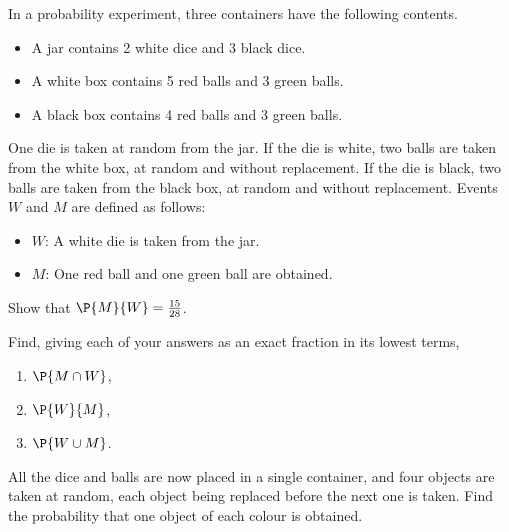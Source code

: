 \begin{problem}
    In a probability experiment, three containers have the following contents.
    \begin{itemize}
        \item A jar contains 2 white dice and 3 black dice.
        \item A white box contains 5 red balls and 3 green balls.
        \item A black box contains 4 red balls and 3 green balls.
    \end{itemize}
    One die is taken at random from the jar. If the die is white, two balls are taken from the white box, at random and without replacement. If the die is black, two balls are taken from the black box, at random and without replacement. Events $W$ and $M$ are defined as follows:
    \begin{itemize}
        \item $W$: A white die is taken from the jar.
        \item $M$: One red ball and one green ball are obtained.
    \end{itemize}
    Show that $\P{M}{W} = \frac{15}{28}$.

    Find, giving each of your answers as an exact fraction in its lowest terms,
    \begin{enumerate}
        \item $\P{M \cap W}$,
        \item $\P{W}{M}$,
        \item $\P{W \cup M}$.
    \end{enumerate}

    All the dice and balls are now placed in a single container, and four objects are taken at random, each object being replaced before the next one is taken. Find the probability that one object of each colour is obtained.
\end{problem}
